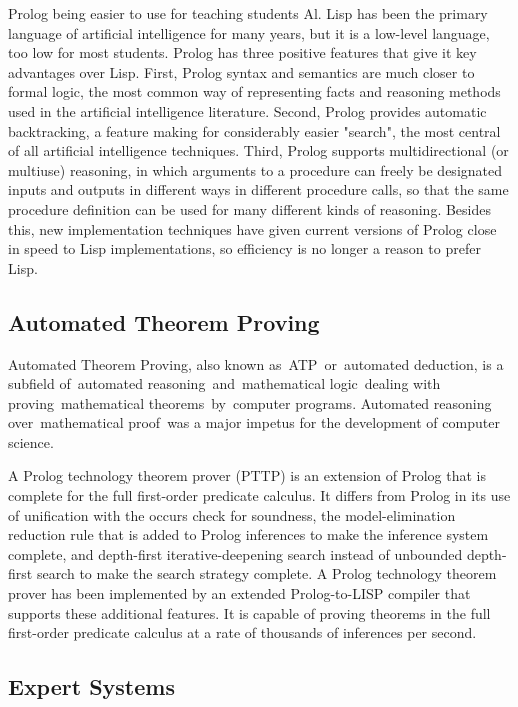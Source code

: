 \documentclass[14pt]{article}
\begin{document}
Prolog being easier to use for teaching students Al. Lisp has been the primary language of artificial intelligence for many years, but it is a low-level language, too low for most students. Prolog has three positive features that give it key advantages over Lisp. First, Prolog syntax and semantics are much closer to formal logic, the most common way of representing facts and reasoning methods used in the artificial intelligence literature. Second, Prolog provides automatic backtracking, a feature making for considerably easier "search", the most central of all artificial intelligence techniques. Third, Prolog supports multidirectional (or multiuse) reasoning, in which arguments to a procedure can freely be designated inputs and outputs in different ways in different procedure calls, so that the same procedure definition can be used for many different kinds of reasoning. Besides this, new implementation techniques have given current versions of Prolog close in speed to Lisp implementations, so efficiency is no longer a reason to prefer Lisp.

\subsection{Automated Theorem Proving}

Automated Theorem Proving, also known as ATP or automated deduction, is a subfield of automated reasoning and mathematical logic dealing with proving mathematical theorems by computer programs. Automated reasoning over mathematical proof was a major impetus for the development of computer science.

A Prolog technology theorem prover (PTTP) is an extension of Prolog that is complete for the full first-order predicate calculus. It differs from Prolog in its use of unification with the occurs check for soundness, the model-elimination reduction rule that is added to Prolog inferences to make the inference system complete, and depth-first iterative-deepening search instead of unbounded depth-first search to make the search strategy complete. A Prolog technology theorem prover has been implemented by an extended Prolog-to-LISP compiler that supports these additional features. It is capable of proving theorems in the full first-order predicate calculus at a rate of thousands of inferences per second.

\subsection{Expert Systems}
 
\end{document}
